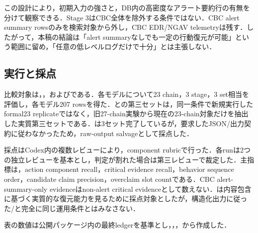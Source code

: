 この設計により，初期入力の強さと，DB内の高密度なアラート要約行の有無を分けて観察できる．Stage 3はCBC全体を除外する条件ではない．CBC alert summary rowsのみを検索対象から外し，CBC EDR/NGAV telemetryは残す．したがって，本稿の結論は「alert summaryなしでも一定の行動復元が可能」という範囲に留め，「任意の低レベルログだけで十分」とは主張しない．

\subsection{実行と採点}

比較対象は，，およびである．各モデルについて23 chain，3 stage，3 set相当を評価し，各モデル207 rowsを得た．との第三セットは，同一条件で新規実行したformal23 replicateではなく，旧27-chain実験から現在の23-chain対象だけを抽出した実質第三セットである．は3セット完了しているが，要求したJSON/出力契約に従わなかったため，raw-output salvageとして採点した．

採点はCodex内の複数レビューにより，component rubricで行った．各runは2つの独立レビューを基本とし，判定が割れた場合は第三レビューで裁定した．主指標は，action component recall，critical evidence recall，behavior sequence order，candidate claim precision，overclaim slot countである．CBC alert-summary-only evidenceはnon-alert critical evidenceとして数えない．は内容包含に基づく実質的な復元能力を見るために採点対象としたが，構造化出力に従った/と完全に同じ運用条件とはみなさない．

表の数値は公開パッケージ内の最終ledgerを基準とし，，，から作成した．


